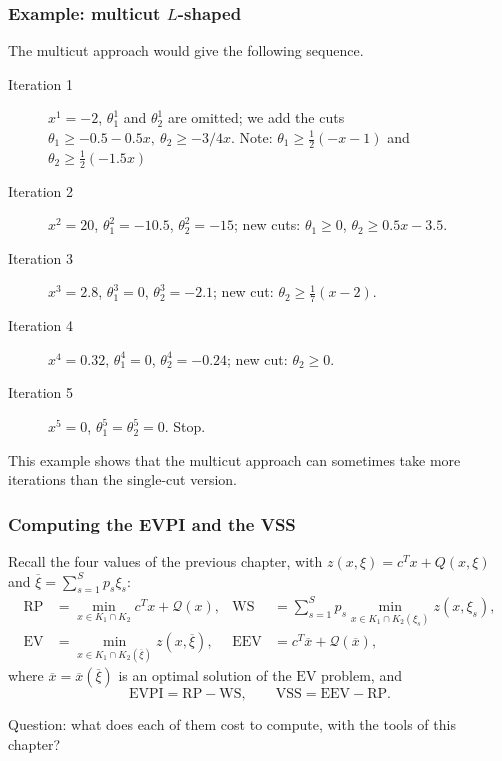\documentclass[aspectratio=169]{beamer}
\def\cQ{\mathcal{Q}}
\newcommand{\WS}{\mathrm{WS}}
\newcommand{\RP}{\mathrm{RP}}
\newcommand{\EV}{\mathrm{EV}}
\newcommand{\EEV}{\mathrm{EEV}}
\newcommand{\EVPI}{\mathrm{EVPI}}
\newcommand{\VSS}{\mathrm{VSS}}
\begin{document}
\begin{frame}
\frametitle{Example: multicut $L$-shaped}

The multicut approach would give the following sequence.
\begin{description}
\item[Iteration 1] $x^1 = -2$, $\theta_1^1$ and $\theta_2^1$ are omitted;
we add the cuts $\theta_1 \geq -0.5 - 0.5x,\ \theta_2 \geq -3/4x$.
Note: $\theta_1 \geq \frac{1}{2} (-x-1)$ and $\theta_2 \geq \frac{1}{2} (-1.5x)$
\item[Iteration 2] $x^2 = 20$, $\theta_1^2 = -10.5$, $\theta_2^2 =
-15$; new cuts: $\theta_1 \geq 0$, $\theta_2 \geq 0.5x - 3.5$.
\item[Iteration 3] $x^3 = 2.8$, $\theta_1^3 = 0$, $\theta_2^3 = -2.1$;
new cut: $\theta_2 \geq \frac{1}{7}(x-2)$.
\item[Iteration 4] $x^4 = 0.32$, $\theta_1^4 = 0$, $\theta_2^4 =
-0.24$; new cut: $\theta_2 \geq 0$.
\item[Iteration 5] $x^5 = 0$, $\theta_1^5 = \theta_2^5 = 0$. Stop.
\end{description}

\mbox{}

This example shows that the multicut approach can sometimes take more iterations than the single-cut version.

\end{frame}

\begin{frame}
\frametitle{Computing the EVPI and the VSS}

Recall the four values of the previous chapter, with $z(x,\xi) = c^Tx + Q(x,\xi)$ and
$\overline{\xi} = \sum_{s=1}^S p_s\xi_s$:
\begin{align*}
\RP &= \min_{x \in K_1 \cap K_2} c^Tx + \cQ(x), &
\WS &= \sum_{s=1}^S p_s \min_{x \in K_1 \cap K_2(\xi_s)} z(x,\xi_s), \\
\EV &= \min_{x \in K_1 \cap K_2(\overline{\xi})} z(x,\overline{\xi}), &
\EEV &= c^T\overline{x} + \cQ(\overline{x}),
\end{align*}
where $\overline{x} = \overline{x}(\overline{\xi})$ is an optimal solution of the $\EV$ problem, and
\[
\EVPI = \RP - \WS, \qquad \VSS = \EEV - \RP.
\]

\mbox{}

{\red Question}: what does each of them cost to compute, with the tools of this chapter?

\end{frame}
\end{document}
